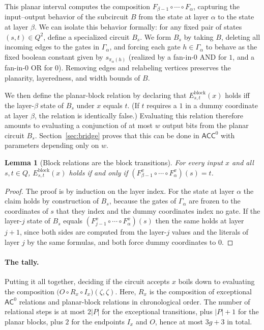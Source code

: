\documentclass[11pt]{article}
\newtheorem{lemma}[theorem]{Lemma}
\theoremstyle{definition}
\theoremstyle{remark}
\newcommand{\ACC}{\mathsf{ACC}^0}
\newcommand{\AC}{\mathsf{AC}^0}
\newcommand{\comp}{\circ}
\begin{document}
     This planar interval computes the composition $F_{\beta-1}\comp\cdots\comp F_{\alpha}$, capturing the input--output behavior of the subcircuit $B$ from the state at layer $\alpha$ to the state at layer $\beta$. We can isolate this behavior formally: for any fixed pair of states $(s,t)\in Q^2$, define a specialized circuit $B_{s}$. We form $B_{s}$ by taking $B$, deleting all incoming edges to the gates in $\Gamma_\alpha$, and forcing each gate $h\in \Gamma_\alpha$ to behave as the fixed boolean constant given by $s_{\pi_\alpha(h)}$ (realized by a fan-in-$0$ $\mathrm{AND}$ for $1$, and a fan-in-$0$ $\mathrm{OR}$ for $0$). Removing edges and relabeling vertices preserves the planarity, layeredness, and width bounds of $B$.

We then define the planar-block relation by declaring that $E^{\mathrm{block}}_{s,t}(x)$
holds iff the layer-$\beta$ state of $B_s$ under $x$ equals $t$.
(If $t$ requires a $1$ in a dummy coordinate at layer $\beta$, the relation is identically false.) Evaluating this relation therefore amounts to evaluating a conjunction of at most $w$ output bits from the planar circuit $B_s$. Section~\ref{sec:bridge} proves that this can be done in $\ACC$ with parameters depending only on $w$.

\begin{lemma}[Block relations are the block transitions]\label{lem:blockrel}
For every input $x$ and all $s,t\in Q$, $E^{\mathrm{block}}_{s,t}(x)$ holds if and only if $(F^x_{\beta-1}\comp\cdots\comp F^x_{\alpha})(s)=t$.
\end{lemma}
\begin{proof}
The proof is by induction on the layer index. For the state at layer $\alpha$ the claim holds by construction of $B_s$, because the gates of $\Gamma_\alpha$ are frozen to the coordinates of $s$ that they index and the dummy coordinates index no gate. If the layer-$j$ state of $B_s$ equals $(F^x_{j-1}\comp\cdots\comp F^x_\alpha)(s)$ then the same holds at layer $j+1$, since both sides are computed from the layer-$j$ values and the literals of layer $j$ by the same formulas, and both force dummy coordinates to $0$.
\end{proof}

\paragraph{The tally.}
Putting it all together, deciding if the circuit accepts $x$ boils down to evaluating the composition
$\bigl(O\comp R_x\comp I_x\bigr)(\zeta,\zeta)$. Here, $R_x$ is the composition of exceptional $\AC$ relations and planar-block relations in chronological order. The number of relational steps is at most $2|P|$ for the exceptional transitions, plus
$|P|+1$ for the planar blocks, plus $2$ for the endpoints $I_x$ and $O$, hence at most
$3g+3$ in total.
\end{document}
